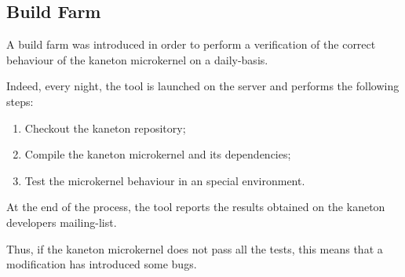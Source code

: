 %
%
%
%
%
%

%
%

\subsection{Build Farm}
\label{section:build farm}

A build farm was introduced in order to perform a verification
of the correct behaviour of the kaneton microkernel on a daily-basis.

Indeed, every night, the  tool is launched on the
 server and performs the following steps:

\begin{enumerate}
  \item
    Checkout the kaneton repository;
  \item
    Compile the kaneton microkernel and its dependencies;
  \item
    Test the microkernel behaviour in an special environment.
\end{enumerate}

At the end of the process, the tool reports the results obtained on
the kaneton developers mailing-list.

Thus, if the kaneton microkernel does not pass all the tests, this means
that a modification has introduced some bugs.
